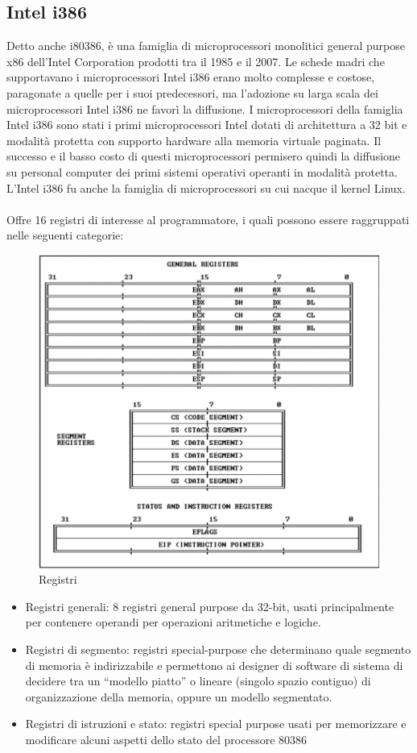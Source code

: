 \documentclass[8pt]{extarticle}
\begin{document}
\subsection{Intel i386}
Detto anche i80386, è una famiglia di microprocessori monolitici general purpose x86 dell'Intel Corporation 
prodotti tra il 1985 e il 2007. Le schede madri che supportavano i microprocessori Intel i386 erano 
molto complesse e costose, paragonate a quelle per i suoi predecessori, ma l'adozione su larga scala 
dei microprocessori Intel i386 ne favorì la diffusione. I microprocessori della famiglia Intel i386 
sono stati i primi microprocessori Intel dotati di architettura a 32 bit e modalità protetta con 
supporto hardware alla memoria virtuale paginata. Il successo e il basso costo di questi microprocessori 
permisero quindi la diffusione su personal computer dei primi sistemi operativi operanti in modalità 
protetta. L'Intel i386 fu anche la famiglia di microprocessori su cui nacque il kernel Linux.\\\\
Offre 16 registri di interesse al programmatore, i quali possono essere raggruppati nelle seguenti categorie:
\begin{figure}[H]
    \center
    \includegraphics[scale=0.2]{images/BO1.png}
    \caption{Registri}\label{fig:1}
\end{figure}
\begin{itemize}
    \item Registri generali: 8 registri general purpose da 32-bit, usati principalmente per contenere 
    operandi per operazioni aritmetiche e logiche.
    \item Registri di segmento: registri special-purpose che determinano quale segmento di memoria è 
    indirizzabile e permettono ai designer di software di sistema di decidere tra un “modello piatto” 
    o lineare (singolo spazio contiguo) di organizzazione della memoria, oppure un modello segmentato.
    \item Registri di istruzioni e stato: registri special purpose usati per memorizzare e modificare 
    alcuni aspetti dello stato del processore 80386
\end{itemize}
\end{document}
